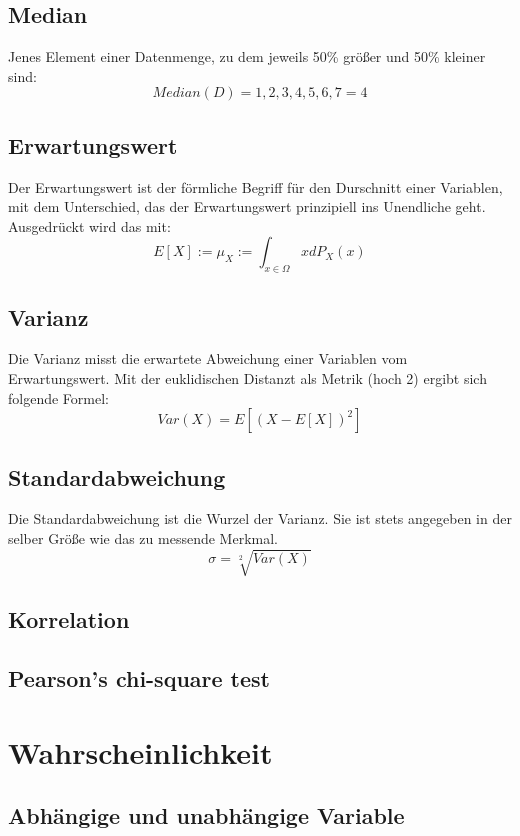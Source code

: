 \documentclass[letterpaper, titlepage]{article}
\begin{document}
\subsection{Median}\label{Median}
Jenes Element einer Datenmenge, zu dem jeweils 50\% größer und 50\% kleiner sind:
$$ Median(D) = {1,2,3,4,5,6,7} = 4$$
\subsection{Erwartungswert}\label{Erwartungswert}
Der Erwartungswert ist der förmliche Begriff für den Durschnitt einer Variablen, mit dem Unterschied, das der Erwartungswert prinzipiell ins Unendliche geht. Ausgedrückt wird das mit:
$$E[X] := \mu_X := \int_{x\in\Omega} x dP_X(x)$$  

\subsection{Varianz}\label{Varianz}
Die Varianz misst die erwartete Abweichung einer Variablen vom Erwartungswert. Mit der euklidischen Distanzt als Metrik (hoch 2) ergibt sich folgende Formel:
$$Var(X) = E[(X-E[X])^2]$$

\subsection{Standardabweichung}\label{Standardabweichung}
Die Standardabweichung ist die Wurzel der Varianz. Sie ist stets angegeben in der selber Größe wie das zu messende Merkmal.
$$\sigma = \sqrt[2]{Var(X)}$$

\subsection{Korrelation}\label{Korrelation}



\subsection{Pearson's chi-square test}\label{Pearson's chi-square test}


\section{Wahrscheinlichkeit}\label{Wahrscheinlichkeit}

\subsection{Abhängige und unabhängige Variable}\label{Abhängige und unabhängige Variable}
\end{document}
